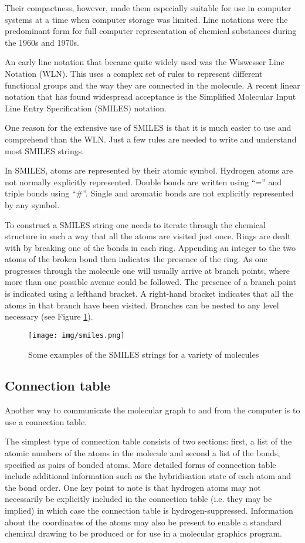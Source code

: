 \documentclass[thesis=M,english]{FITthesis}[2012/10/20]
\begin{document}
Their compactness, however, made them especially suitable for use in computer systems at a time when computer storage was limited. Line notations were the predominant form for full computer representation of chemical substances during the 1960s and 1970s.\cite{handbook}

An early line notation that became quite widely used was the Wiswesser Line Notation (WLN). This uses a complex set of rules to represent different functional groups and the way they are connected in the molecule. A recent linear notation that has found widespread acceptance is the Simplified Molecular Input Line Entry Specification (SMILES) notation.

One reason for the extensive use of SMILES is that it is much easier to use and comprehend than the WLN. Just a few rules are needed to write and understand most SMILES strings.

In SMILES, atoms are represented by their atomic symbol. Hydrogen atoms are not normally explicitly represented. Double bonds are written using ``='' and triple bonds using ``\#''. Single and aromatic bonds are not explicitly represented by any symbol. 

To construct a SMILES string one needs to iterate through the chemical structure in such a way that all the atoms are visited just once. Rings are dealt with by breaking one of the bonds in each ring. Appending an integer to the two atoms of the broken bond then indicates the presence of the ring. As one progresses through the molecule one will usually arrive at branch points, where more than one possible avenue could be followed. The presence of a branch point is indicated using a lefthand bracket. A right-hand bracket indicates that all the atoms in that branch have been visited. Branches can be nested to any level necessary (see Figure \ref{fig:smiles}).\cite{intro}

\begin{figure}
  \centering
  \texttt{[image: img/smiles.png]}
  \caption{Some examples of the SMILES strings for a variety of molecules}
  \label{fig:smiles}
\end{figure}

\subsection{Connection table}
Another way to communicate the molecular graph to and from the computer is to use a connection table. 

The simplest type of connection table consists of two sections: first, a list of the atomic numbers of the atoms in the molecule and second a list of the bonds, specified as pairs of bonded atoms. More detailed forms of connection table include additional information such as the hybridisation state of each atom and the bond order. One key point to note is that hydrogen atoms may not necessarily be explicitly included in the connection table (i.e. they may be implied) in which case the connection table is hydrogen-suppressed. Information about the coordinates of the atoms may also be present to enable a standard chemical drawing to be produced or for use in a molecular graphics program.\cite{intro}
\end{document}

